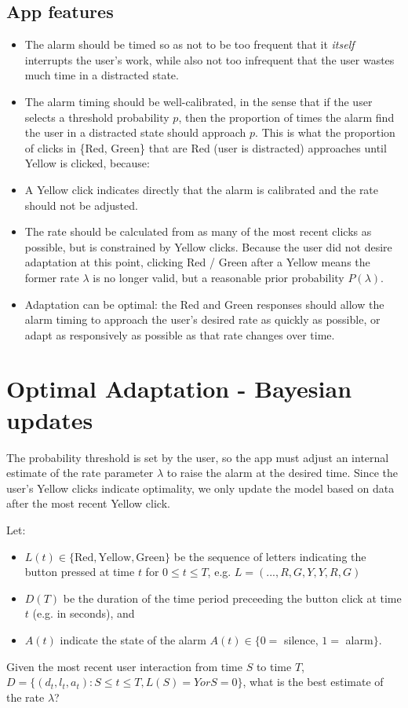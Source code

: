 \documentclass{article}
\begin{document}
\subsection{App features}
\begin{itemize}
\item The alarm should be timed so as not to be too frequent that it \emph{itself} interrupts the user's work, while also not too infrequent that the user wastes much time in a distracted state.
\item The alarm timing should be well-calibrated, in the sense that if the user selects a threshold probability $p$, then the proportion of times the alarm find the user in a distracted state should approach $p$.  This is what the proportion of clicks in \{Red, Green\} that are Red (user is distracted) approaches until Yellow is clicked, because:
\item A Yellow click indicates directly that the alarm is calibrated and the rate should not be adjusted.
\item The rate should be calculated from as many of the most recent clicks as possible, but is constrained by Yellow clicks.  Because the user did not desire adaptation at this point, clicking Red / Green after a Yellow means the former rate $\lambda$ is no longer valid, but a reasonable prior probability $P(\lambda)$.


\item Adaptation can be optimal:  the Red and Green responses should allow the alarm timing to approach the user's desired rate as quickly as possible, or adapt as responsively as possible as that rate changes over time.
\end{itemize}

\section{Optimal Adaptation - Bayesian updates}
The probability threshold is set by the user, so the app must adjust an internal estimate of the rate parameter $\lambda$ to raise the alarm at the desired time.  Since the user's Yellow clicks indicate optimality, we only update the model based on data after the most recent Yellow click.

Let:
\begin{itemize}
\item $L(t)\in \{\text{Red},\text{Yellow},\text{Green}\}$ be the sequence of letters indicating the button pressed at time $t$ for $0 \leq t \leq T$, e.g. $L=(..., R, G, Y, Y, R, G)$
\item $D(T)$ be the duration of the time period preceeding the button click at time $t$ (e.g. in seconds), and
\item $A(t)$ indicate the state of the alarm $A(t) \in \{0=$ silence, $1=$ alarm$\}$.
\end{itemize} 
Given the most recent user interaction from time $S$ to time $T$,  $D=\{(d_t, l_t, a_t) : S \leq t \leq T , L(S)=Y or S=0\}$, what is the best estimate of the rate $\lambda$?
\end{document}
